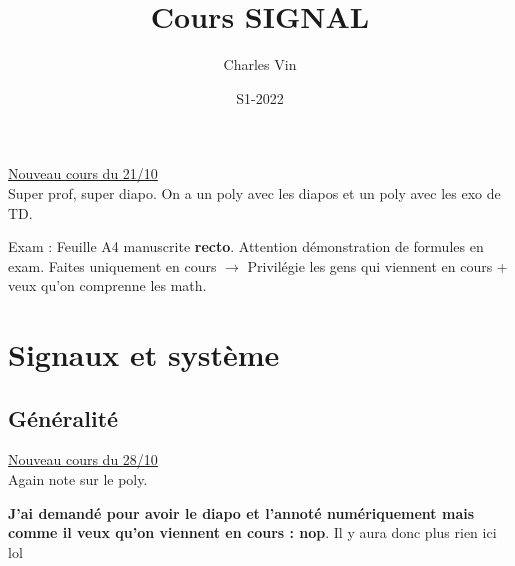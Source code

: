 \documentclass{article}
\title{Cours SIGNAL}
\author{Charles Vin}
\date{S1-2022}
\theoremstyle{plain}%
\theoremstyle{definition}
\theoremstyle{remark}
\begin{document}
\maketitle

\underline{Nouveau cours du 21/10} \\

Super prof, super diapo. On a un poly avec les diapos et un poly avec les exo de TD.

Exam : Feuille A4 manuscrite \textbf{recto}. Attention démonstration de formules en exam. Faites uniquement en cours $\rightarrow$ Privilégie les gens qui viennent en cours + veux qu'on comprenne les math.

\section{Signaux et système}
\subsection{Généralité}

\underline{Nouveau cours du 28/10} \\
Again note sur le poly.

\textbf{J'ai demandé pour avoir le diapo et l'annoté numériquement mais comme il veux qu'on viennent en cours : nop}. Il y aura donc plus rien ici lol
\end{document}
